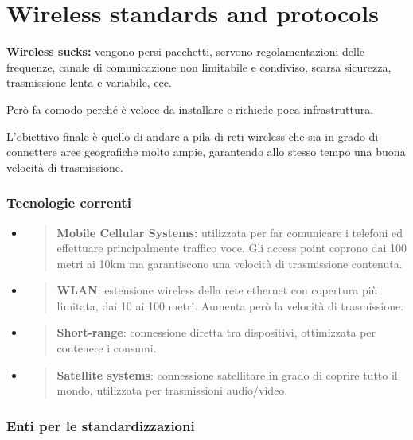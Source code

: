 \chapter{Wireless standards and protocols}
\label{wireless-standards-and-protocols}

\textbf{Wireless sucks:} vengono persi pacchetti, servono
regolamentazioni delle frequenze, canale di comunicazione non limitabile
e condiviso, scarsa sicurezza, trasmissione lenta e variabile, ecc.

Però fa comodo perché è veloce da installare e richiede poca
infrastruttura.

L'obiettivo finale è quello di andare a pila di reti wireless che sia in
grado di connettere aree geografiche molto ampie, garantendo allo stesso
tempo una buona velocità di trasmissione.

\subsection{Tecnologie correnti}\label{tecnologie-correnti}

\begin{itemize}
\item
  \begin{quote}
  \textbf{Mobile Cellular Systems:} utilizzata per far comunicare i
  telefoni ed effettuare principalmente traffico voce. Gli access point
  coprono dai 100 metri ai 10km ma garantiscono una velocità di
  trasmissione contenuta.
  \end{quote}
\item
  \begin{quote}
  \textbf{WLAN}: estensione wireless della rete ethernet con copertura
  più limitata, dai 10 ai 100 metri. Aumenta però la velocità di
  trasmissione.
  \end{quote}
\item
  \begin{quote}
  \textbf{Short-range}: connessione diretta tra dispositivi, ottimizzata
  per contenere i consumi.
  \end{quote}
\item
  \begin{quote}
  \textbf{Satellite systems}: connessione satellitare in grado di
  coprire tutto il mondo, utilizzata per trasmissioni audio/video.
  \end{quote}
\end{itemize}

\subsection{Enti per le
standardizzazioni}\label{enti-per-le-standardizzazioni}

